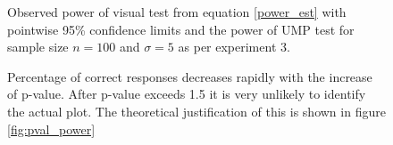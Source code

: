 \documentclass{article}
\begin{document}
\begin{figure}[hbtp]
   \centering
       \caption{Observed power of visual test from equation \eqref{power_est} with pointwise 95\% confidence limits and the power of UMP test for sample size $n= 100$ and $\sigma = 5$ as per experiment 3. }
       \label{fig:power_observed_exp3}
\end{figure}


\begin{figure}[hbtp]
   \centering
       \caption{Percentage of correct responses decreases rapidly with the increase of p-value. After p-value exceeds 1.5 it is very unlikely to identify the actual plot. The theoretical justification of this is shown in figure \ref{fig:pval_power}}
       \label{fig:pval_pcorrect}
\end{figure}
\end{document}
